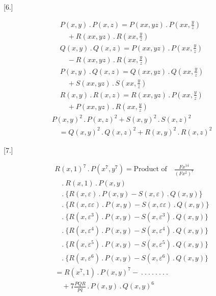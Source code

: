\par\medskip{}\centerline{[6.]}\nobreak\smallskip
\[
\begin{gathered}
P(x,y)\,.\,P(x,z)=P(xx,yz)\,.\,P(xx,\tfrac{y}{z})\\[8pt]\quad{}+R(xx,yz)\,.\,R(xx,\tfrac{y}{z})\\[8pt]
Q(x,y)\,.\,Q(x,z)=P(xx,yz)\,.\,P(xx,\tfrac{y}{z})\\[8pt]\quad{}-R(xx,yz)\,.\,R(xx,\tfrac{y}{z})\\[8pt]
P(x,y)\,.\,Q(x,z)=Q(xx,yz)\,.\,Q(xx,\tfrac{y}{z})\\[8pt]\quad{}+S(xx,yz)\,.\,S(xx,\tfrac{y}{z})\\[8pt]
R(x,y)\,.\,R(x,z)=R(xx,yz)\,.\,P(xx,\tfrac{y}{z})\\[8pt]\quad{}+P(xx,yz)\,.\,R(xx,\tfrac{y}{z})
\end{gathered}
\]
\[
\begin{gathered}P(x,y)^2\,.\,P(x,z)^2+S(x,y)^2\,.\,S(x,z)^2
\\[8pt]\quad{}=Q(x,y)^2\,.\,Q(x,z)^2+R(x,y)^2\,.\,R(x,z)^2\end{gathered}
\]


\par\medskip{}\centerline{[7.]}\nobreak\smallskip
\[
\begin{gathered}
R(x,1)^7\,.\,P(x^7,y^7)=\text{Product of}\quad\frac{Fx^{14}}{(Fx^2)^7}\\[8pt]
\quad .\ R(x,1)\,.\,P(x,y)\\[8pt]
\quad .\ \{R(x,\varepsilon)\,.\,P(x,y)-S(x,\varepsilon)\,.\,Q(x,y)\}\\[8pt]
\quad .\ \{R(x,\varepsilon\varepsilon)\,.\,P(x,y)-S(x,\varepsilon\varepsilon)\,.\,Q(x,y)\}\\[8pt]
\quad .\ \{R(x,\varepsilon^3)\,.\,P(x,y)-S(x,\varepsilon^3)\,.\,Q(x,y)\}\\[8pt]
\quad .\ \{R(x,\varepsilon^4)\,.\,P(x,y)-S(x,\varepsilon^4)\,.\,Q(x,y)\}\\[8pt]
\quad .\ \{R(x,\varepsilon^5)\,.\,P(x,y)-S(x,\varepsilon^5)\,.\,Q(x,y)\}\\[8pt]
\quad .\ \{R(x,\varepsilon^6)\,.\,P(x,y)-S(x,\varepsilon^6)\,.\,Q(x,y)\}\\[8pt]
=R(x^7,1)\,.\,P(x,y)^7-\ .\ .\ .\ .\ .\ .\ .\ .\ \\[8pt]\quad{}+7\frac{PQR}{pq}\,.\,P(x,y)\,.\,Q(x,y)^6
\end{gathered}
\]

